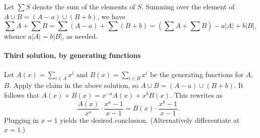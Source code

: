 Let $\sum S$ denote the sum of the elements of $S$. Summing over the element of $A\cup B=(A-a)\cup(B+b)$, we have \[\sum A+\sum B=\sum(A-a)+\sum(B+b)=\left(\sum A+\sum B\right)-a|A|+b|B|,\]
whence $a|A|=b|B|$, as needed.

\paragraph{Third solution, by generating functions} Let $A(x)=\sum_{i\in A}x^i$ and $B(x)=\sum_{i\in B}x^i$ be the generating functions for $A$, $B$. Apply the claim in the above solution, so $A\cup B=(A-a)\cup(B+b)$. It follows that $A(x)+B(x)=x^{-a}A(x)+x^bB(x)$. This rewrites as \[\frac{A(x)}{x^a}\cdot\frac{x^a-1}{x-1}=B(x)\cdot\frac{x^b-1}{x-1}.\]
Plugging in $x=1$ yields the desired conclusion. (Alternatively differentiate at $x=1$.)


